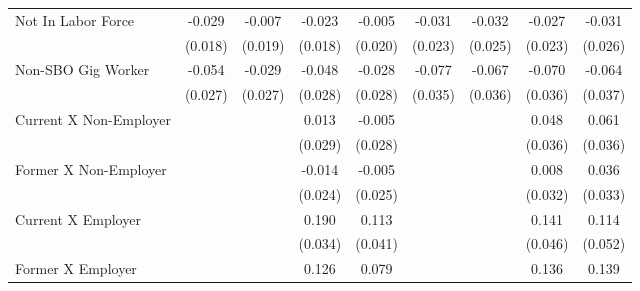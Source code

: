 {\begin{tabular}{l*{8}{c}}
Not In Labor Force  &      -0.029         &      -0.007         &      -0.023         &      -0.005         &      -0.031         &      -0.032         &      -0.027         &      -0.031         \\
                    &     (0.018)         &     (0.019)         &     (0.018)         &     (0.020)         &     (0.023)         &     (0.025)         &     (0.023)         &     (0.026)         \\
Non-SBO Gig Worker  &      -0.054\sym{*}  &      -0.029         &      -0.048         &      -0.028         &      -0.077\sym{*}  &      -0.067         &      -0.070         &      -0.064         \\
                    &     (0.027)         &     (0.027)         &     (0.028)         &     (0.028)         &     (0.035)         &     (0.036)         &     (0.036)         &     (0.037)         \\
Current X Non-Employer&                     &                     &       0.013         &      -0.005         &                     &                     &       0.048         &       0.061         \\
                    &                     &                     &     (0.029)         &     (0.028)         &                     &                     &     (0.036)         &     (0.036)         \\
Former X Non-Employer&                     &                     &      -0.014         &      -0.005         &                     &                     &       0.008         &       0.036         \\
                    &                     &                     &     (0.024)         &     (0.025)         &                     &                     &     (0.032)         &     (0.033)         \\
Current X Employer  &                     &                     &       0.190\sym{***}&       0.113\sym{**} &                     &                     &       0.141\sym{**} &       0.114\sym{*}  \\
                    &                     &                     &     (0.034)         &     (0.041)         &                     &                     &     (0.046)         &     (0.052)         \\
Former X Employer   &                     &                     &       0.126\sym{*}  &       0.079         &                     &                     &       0.136         &       0.139\sym{*}  \\

\end{tabular}}
